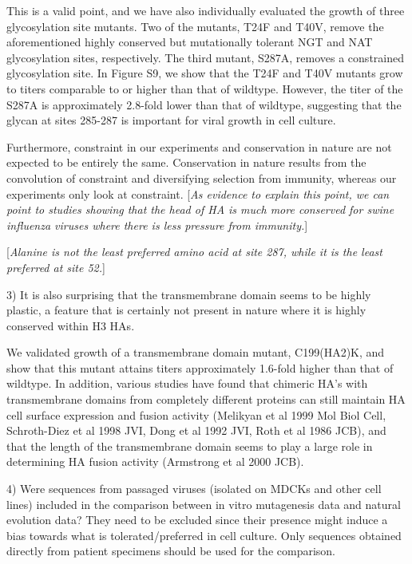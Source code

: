 \documentclass[11pt, oneside]{article}   	%
\newcommand{\comment}[1]{{\color{red}[\textsl{#1}]}}
\newcommand{\response}[1]{{\color{black}#1}}
\begin{document}
\response{This is a valid point, and we have also individually evaluated the growth of three glycosylation site mutants.
Two of the mutants, T24F and T40V, remove the aforementioned highly conserved but mutationally tolerant NGT and NAT glycosylation sites, respectively.
The third mutant, S287A, removes a constrained glycosylation site.
In Figure S9, we show that the T24F and T40V mutants grow to titers comparable to or higher than that of wildtype. 
However, the titer of the S287A is approximately 2.8-fold lower than that of wildtype, suggesting that the glycan at sites 285-287 is important for viral growth in cell culture. 

Furthermore, constraint in our experiments and conservation in nature are not expected to be entirely the same.
Conservation in nature results from the convolution of constraint and diversifying selection from immunity, whereas our experiments only look at constraint.
\comment{As evidence to explain this point, we can point to studies showing that the head of HA is much more conserved for swine influenza viruses where there is less pressure from immunity.}
}

\comment{Alanine is not the least preferred amino acid at site 287, while it is the least preferred at site 52.}

3) It is also surprising that the transmembrane domain seems to be highly plastic, a feature that is certainly not present in nature where it is highly conserved within H3 HAs. 

\response{We validated growth of a transmembrane domain mutant, C199(HA2)K, and show that this mutant attains titers approximately 1.6-fold higher than that of wildtype.
In addition, various studies have found that chimeric HA's with transmembrane domains from completely different proteins can still maintain HA cell surface expression and fusion activity (Melikyan et al 1999 Mol Biol Cell, Schroth-Diez et al 1998 JVI, Dong et al 1992 JVI, Roth et al 1986 JCB), and that the length of the transmembrane domain seems to play a large role in determining HA fusion activity (Armstrong et al 2000 JCB).
}

4) Were sequences from passaged viruses (isolated on MDCKs and other cell lines) included in the comparison between in vitro mutagenesis data and natural evolution data? They need to be excluded since their presence might induce a bias towards what is tolerated/preferred in cell culture. Only sequences obtained directly from patient specimens should be used for the comparison. 
\end{document}
